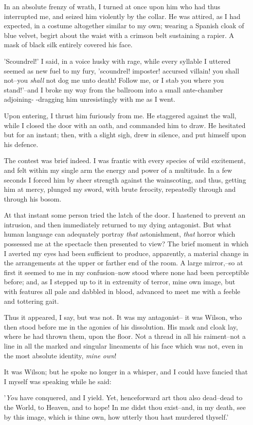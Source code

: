 \documentclass[12pt]{article}
\begin{document}
     In an absolute frenzy of wrath, I turned at once upon him who
had thus interrupted me, and seized him violently by the collar. 
He was attired, as I had expected, in a costume altogether similar
to my own; wearing a Spanish cloak of blue velvet, begirt about the
waist with a crimson belt sustaining a rapier.  A mask of black
silk entirely covered his face.

     'Scoundrel!' I said, in a voice husky with rage, while every
syllable I uttered seemed as new fuel to my fury, 'scoundrel!
imposter! accursed villain! you shall not--you \emph{shall} not dog me
unto death!  Follow me, or I stab you where you stand!'--and I
broke my way from the ballroom into a small ante-chamber adjoining-
-dragging him unresistingly with me as I went.

     Upon entering, I thrust him furiously from me.  He staggered
against the wall, while I closed the door with an oath, and
commanded him to draw.  He hesitated but for an instant; then, with
a slight sigh, drew in silence, and put himself upon his defence.

     The contest was brief indeed.  I was frantic with every
species of wild excitement, and felt within my single arm the
energy and power of a multitude.  In a few seconds I forced him by
sheer strength against the wainscoting, and thus, getting him at
mercy, plunged my sword, with brute ferocity, repeatedly through
and through his bosom.

     At that instant some person tried the latch of the door.  I
hastened to prevent an intrusion, and then immediately returned to
my dying antagonist.  But what human language can adequately
portray \emph{that} astonishment, \emph{that} horror which possessed me
at the spectacle then presented to view?  The brief moment
in which I averted my eyes had been sufficient to produce,
apparently, a material change in the arrangements at the upper or
farther end of the room.  A large mirror,--so at first it seemed to
me in my confusion--now stood where none had been perceptible
before; and, as I stepped up to it in extremity of terror, mine own
image, but with features all pale and dabbled in blood, advanced to
meet me with a feeble and tottering gait.

     Thus it appeared, I say, but was not.  It was my antagonist--
it was Wilson, who then stood before me in the agonies of his
dissolution.  His mask and cloak lay, where he had thrown them,
upon the floor.  Not a thread in all his raiment--not a line in all
the marked and singular lineaments of his face which was not, even
in the most absolute identity, \emph{mine own}!

     It was Wilson; but he spoke no longer in a whisper, and I
could have fancied that I myself was speaking while he said:

     '\emph{You} have conquered, and I yield.  Yet, henceforward art
thou also dead--dead to the World, to Heaven, and to hope!  In me
didst thou exist--and, in my death, see by this image, which is
thine own, how utterly thou hast murdered thyself.'
\end{document}
